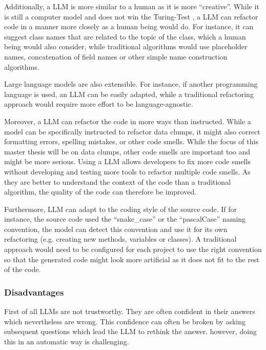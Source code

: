 Additionally, a \ac{LLM} is more similar to a human as it is more  \enquote{creative}. While it is still a computer model and does not win the Turing-Test \cite{turing_test}, a \ac{LLM} can refactor code in a manner more closely as a human being would do. For instance, it can suggest class names that are related to the topic of the class, which a human being would also consider, while traditional algorithms would use placeholder names, concatenation of field names or other simple name construction algorithms. \cite{shirafuji2023refactoring}

Large language models are also extensible. For instance, if another programming language is used, an \ac{LLM} can be easily adapted, while a traditional refactoring approach would require more effort to be language-agnostic.

Moreover, a \ac{LLM} can refactor the code in more ways than instructed. While a model can be specifically instructed to refactor data clumps, it might also correct formatting errors, spelling mistakes, or other code smells. While the focus of this master thesis will be on data clumps, other code smells are important too and might be more serious. Using a  \ac{LLM} allows developers to fix more code smells without developing and testing more tools to refactor multiple code smells. As they are better to understand the context of the code than a traditional algorithm, the quality of the code can therefore be improved. \cite{shirafuji2023refactoring}

Furthermore, \ac{LLM} can adapt to the coding style of the source code. If for instance, the source code used the \enquote{snake\_case} or the \enquote{pascalCase} naming convention, the model can detect this convention and use it for its own refactoring (e.g. creating new methods, variables or classes). A traditional approach would need to be configured for each project to use the right convention so that the generated code might look more artificial as it does not fit to the rest of the code.


\subsubsection{Disadvantages}

First of all \ac{LLM}s are not trustworthy. They are often confident in their answers which nevertheless are wrong. This confidence can often be broken by asking subsequent questions which lead the \ac{LLM} to rethink the answer. however, doing this in an automatic way is challenging. \cite{azaria2023internal}

